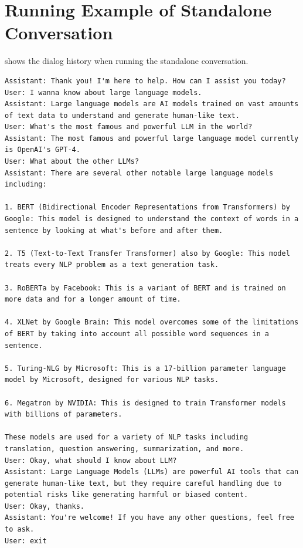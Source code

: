 \appendix

\section{Running Example of Standalone Conversation}
\label{app:conv}

 shows the dialog history when running the standalone conversation. 

\begin{lstlisting}[language=Dialog, float={th}, caption={A running example of standalone conversation.}, label={lst:conv_history}]
Assistant: Thank you! I'm here to help. How can I assist you today?
User: I wanna know about large language models. 
Assistant: Large language models are AI models trained on vast amounts of text data to understand and generate human-like text.
User: What's the most famous and powerful LLM in the world? 
Assistant: The most famous and powerful large language model currently is OpenAI's GPT-4.
User: What about the other LLMs?
Assistant: There are several other notable large language models including:

1. BERT (Bidirectional Encoder Representations from Transformers) by Google: This model is designed to understand the context of words in a sentence by looking at what's before and after them.

2. T5 (Text-to-Text Transfer Transformer) also by Google: This model treats every NLP problem as a text generation task.

3. RoBERTa by Facebook: This is a variant of BERT and is trained on more data and for a longer amount of time.

4. XLNet by Google Brain: This model overcomes some of the limitations of BERT by taking into account all possible word sequences in a sentence.

5. Turing-NLG by Microsoft: This is a 17-billion parameter language model by Microsoft, designed for various NLP tasks.

6. Megatron by NVIDIA: This is designed to train Transformer models with billions of parameters. 

These models are used for a variety of NLP tasks including translation, question answering, summarization, and more.
User: Okay, what should I know about LLM? 
Assistant: Large Language Models (LLMs) are powerful AI tools that can generate human-like text, but they require careful handling due to potential risks like generating harmful or biased content.
User: Okay, thanks.
Assistant: You're welcome! If you have any other questions, feel free to ask.
User: exit
\end{lstlisting}


